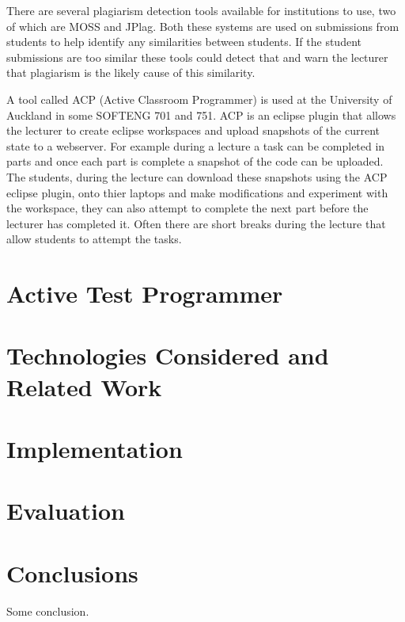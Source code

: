 \documentclass[twocolumn]{article}
\begin{document}
There are several plagiarism detection tools available for institutions to use,
two of which are MOSS\cite{schleimer2003winnowing} and
JPlag\cite{lutz2000jplag}. Both these systems are used on submissions from
students to help identify any similarities between students. If the student
submissions are too similar these tools could detect that and warn the lecturer
that plagiarism is the likely cause of this similarity.

A tool called ACP (Active Classroom Programmer)\cite{giacaman2015active} is used
at the University of Auckland in some SOFTENG 701 and 751. ACP is an eclipse
plugin that allows the lecturer to create eclipse workspaces and upload
snapshots of the current state to a webserver. For example during a lecture a
task can be completed in parts and once each part is complete a snapshot of the
code can be uploaded. The students, during the lecture can download these
snapshots using the ACP eclipse plugin, onto thier laptops and make
modifications and experiment with the workspace, they can also attempt to
complete the next part before the lecturer has completed it. Often there are
short breaks during the lecture that allow students to attempt the tasks.

\section{Active Test Programmer}

\section{Technologies Considered and Related Work}

\section{Implementation}

\section{Evaluation}

\section{Conclusions}
Some conclusion.



\end{document}
